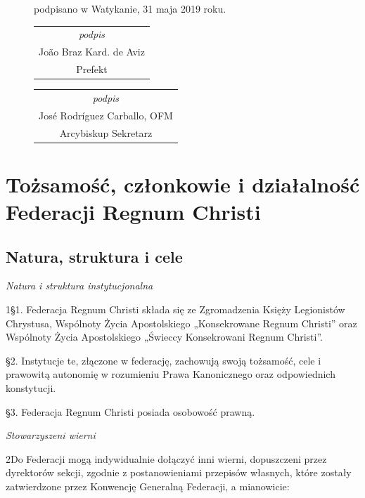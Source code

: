 ﻿\documentclass{book}
\newcommand{\lett}[1]{\lettrine[findent=6pt]{#1}}
\newcommand{\ssec}[1]{\vspace{1em}\textit{#1}\vspace{.5em}\nopagebreak}
\begin{document}
\begin{figure}
\begin{framed}
\begin{footnotesize}
\begin{center}
podpisano w Watykanie, 31 maja 2019 roku.
\end{center}
 
\hfill\begin{tabular}{c}
{\em podpis} \\
João Braz Kard. de Aviz \\
Prefekt
\end {tabular}


\begin{tabular}{c}
{\em podpis} \\
José Rodríguez Carballo, OFM\\
Arcybiskup Sekretarz 
\end{tabular}
 
\end{footnotesize}
\end{framed}
\end{figure}






\part{Tożsamość, członkowie i działalność\\Federacji Regnum Christi}


\chapter{Natura, struktura i cele}


\ssec{Natura i struktura instytucjonalna}


\lett{1} \S{}1. Federacja Regnum Christi składa się ze Zgromadzenia Księży Legionistów Chrystusa, Wspólnoty Życia Apostolskiego „Konsekrowane Regnum Christi” oraz Wspólnoty Życia Apostolskiego „Świeccy Konsekrowani Regnum Christi”.


\S{}2. Instytucje te, złączone w federację, zachowują swoją tożsamość, cele i prawowitą autonomię w rozumieniu Prawa Kanonicznego oraz odpowiednich konstytucji.


\S{}3. Federacja Regnum Christi posiada osobowość prawną. 


\ssec{Stowarzyszeni wierni}


\lett{2} Do Federacji mogą indywidualnie dołączyć inni wierni, dopuszczeni przez dyrektorów sekcji, zgodnie z postanowieniami przepisów własnych, które zostały zatwierdzone przez Konwencję Generalną Federacji, a mianowicie:
\end{document}

